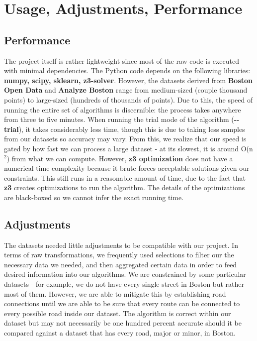 \documentclass[15pt]{report}
\begin{document}
\section*{Usage, Adjustments, Performance}
\subsection*{Performance}
The project itself is rather lightweight since most of the raw code is executed with minimal dependencies. The Python code depends on the following libraries: \textbf{numpy, scipy, sklearn, z3-solver}. However, the datasets derived from \textbf{Boston Open Data} and \textbf{Analyze Boston} range from medium-sized (couple thousand points) to large-sized (hundreds of thousands of points). Due to this, the speed of running the entire set of algorithms is discernible: the process takes anywhere from three to five minutes. When running the trial mode of the algorithm (\textbf{-{}-trial}), it takes considerably less time, though this is due to taking less samples from our datasets so accuracy may vary. From this, we realize that our speed is gated by how fast we can process a large dataset - at its slowest, it is around O(n$^2$) from what we can compute. However, \textbf{z3 optimization} does not have a numerical time complexity because it brute forces acceptable solutions given our constraints. This still runs in a reasonable amount of time, due to the fact that \textbf{z3} creates optimizations to run the algorithm. The details of the optimizations are black-boxed so we cannot infer the exact running time.

\subsection*{Adjustments}
The datasets needed little adjustments to be compatible with our project. In terms of raw transformations, we frequently used selections to filter our the necessary data we needed, and then aggregated certain data in order to feed desired information into our algorithms. We are constrained by some particular datasets - for example, we do not have every single street in Boston but rather most of them. However, we are able to mitigate this by establishing road connections until we are able to be sure that every route can be connected to every possible road inside our dataset. The algorithm is correct within our dataset but may not necessarily be one hundred percent accurate should it be compared against a dataset that has every road, major or minor, in Boston.
\end{document}
